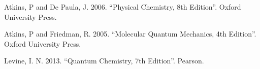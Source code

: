 \documentclass{tufte-book}
\begin{document}
















\begin{thebibliography}{}
 Atkins, P and De Paula, J. 2006. ``Physical Chemistry, 8th Edition''. Oxford University Press.

 Atkins, P and Friedman, R. 2005. ``Molecular Quantum Mechanics, 4th Edition''. Oxford University Press.

 Levine, I. N. 2013. ``Quantum
Chemistry, 7th Edition''. Pearson.
\end{thebibliography}


%
\end{document}
